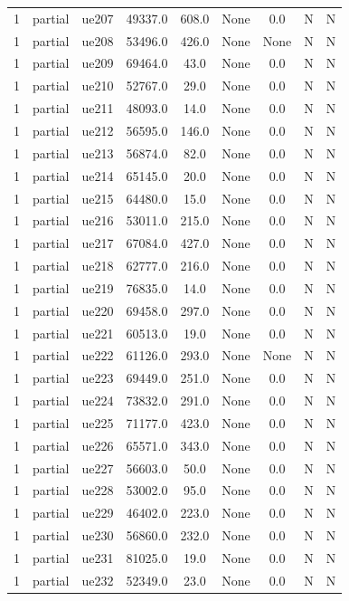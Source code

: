 \begin{table}[ht]
\begin{tabular}{|c|c|c|c|c|c|c|c|c|}
1 & partial & ue207 & 49337.0 & 608.0 & None & 0.0 & N & N \\
1 & partial & ue208 & 53496.0 & 426.0 & None & None & N & N \\
1 & partial & ue209 & 69464.0 & 43.0 & None & 0.0 & N & N \\
1 & partial & ue210 & 52767.0 & 29.0 & None & 0.0 & N & N \\
1 & partial & ue211 & 48093.0 & 14.0 & None & 0.0 & N & N \\
1 & partial & ue212 & 56595.0 & 146.0 & None & 0.0 & N & N \\
1 & partial & ue213 & 56874.0 & 82.0 & None & 0.0 & N & N \\
1 & partial & ue214 & 65145.0 & 20.0 & None & 0.0 & N & N \\
1 & partial & ue215 & 64480.0 & 15.0 & None & 0.0 & N & N \\
1 & partial & ue216 & 53011.0 & 215.0 & None & 0.0 & N & N \\
1 & partial & ue217 & 67084.0 & 427.0 & None & 0.0 & N & N \\
1 & partial & ue218 & 62777.0 & 216.0 & None & 0.0 & N & N \\
1 & partial & ue219 & 76835.0 & 14.0 & None & 0.0 & N & N \\
1 & partial & ue220 & 69458.0 & 297.0 & None & 0.0 & N & N \\
1 & partial & ue221 & 60513.0 & 19.0 & None & 0.0 & N & N \\
1 & partial & ue222 & 61126.0 & 293.0 & None & None & N & N \\
1 & partial & ue223 & 69449.0 & 251.0 & None & 0.0 & N & N \\
1 & partial & ue224 & 73832.0 & 291.0 & None & 0.0 & N & N \\
1 & partial & ue225 & 71177.0 & 423.0 & None & 0.0 & N & N \\
1 & partial & ue226 & 65571.0 & 343.0 & None & 0.0 & N & N \\
1 & partial & ue227 & 56603.0 & 50.0 & None & 0.0 & N & N \\
1 & partial & ue228 & 53002.0 & 95.0 & None & 0.0 & N & N \\
1 & partial & ue229 & 46402.0 & 223.0 & None & 0.0 & N & N \\
1 & partial & ue230 & 56860.0 & 232.0 & None & 0.0 & N & N \\
1 & partial & ue231 & 81025.0 & 19.0 & None & 0.0 & N & N \\
1 & partial & ue232 & 52349.0 & 23.0 & None & 0.0 & N & N \\

\end{tabular}
\end{table}
